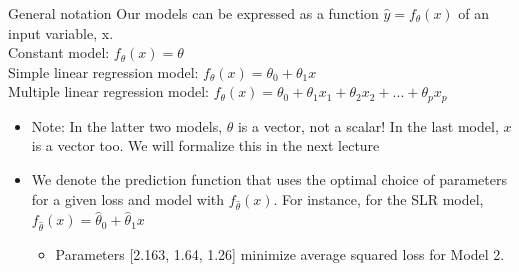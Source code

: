 \documentclass[aspectratio=169]{../latex_main/tntbeamer}  %
\begin{document}
	
	
	\begin{frame}{General notation}
        Our models can be expressed as a function         $\hat{y} = f_\theta (x)$             of an input variable, x.\\
        Constant model: $f_\theta (x) = \theta$\\
        Simple linear regression model: $f_\theta (x) = \theta_0 + \theta_1x$\\
        Multiple linear regression model: $f_\theta (x) = \theta_0 + \theta_1x_1 + \theta_2x_2 + ... + \theta_px_p $\\
        \bigskip
        \begin{itemize}
            \item Note: In the latter two models, $\theta$ is a vector, not a scalar! In the last model, $x$ is a vector too. We will formalize this in the next lecture
            \item We denote the prediction function that uses the optimal choice of parameters for a given loss and model with $f_\hat{\theta}(x)$. For instance, for the SLR  model, $f_\hat{\theta}(x) = \hat{\theta}_0 + \hat{\theta}_1x$                              
            \begin{itemize}
                \item Parameters [2.163, 1.64, 1.26] minimize average squared loss for Model 2.
            \end{itemize}
        \end{itemize}

	\end{frame}
\end{document}
